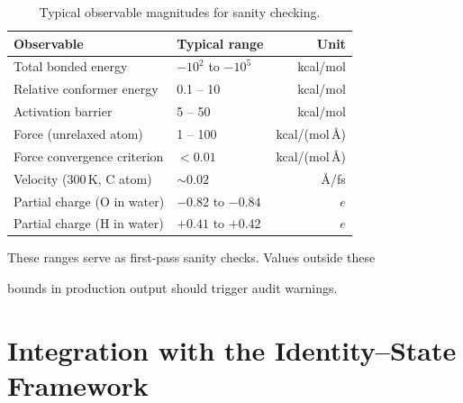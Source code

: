\documentclass[12pt, a4paper, oneside]{article}
\begin{document}
\begin{table}[htbp]

  \centering

  \caption{Typical observable magnitudes for sanity checking.}

  \label{tab:ranges}

  \begin{tabular}{llr}

    \toprule

    Observable & Typical range & Unit \\

    \midrule

    Total bonded energy          & $-10^2$ to $-10^5$   & kcal/mol \\

    Relative conformer energy    & 0.1 -- 10            & kcal/mol \\

    Activation barrier           & 5 -- 50              & kcal/mol \\

    Force (unrelaxed atom)       & 1 -- 100             & kcal/(mol\,\AA) \\

    Force convergence criterion  & $< 0.01$             & kcal/(mol\,\AA) \\

    Velocity (300\,K, C atom)    & $\sim 0.02$          & \AA/fs \\

    Partial charge (O in water)  & $-0.82$ to $-0.84$   & $e$ \\

    Partial charge (H in water)  & $+0.41$ to $+0.42$   & $e$ \\

    \bottomrule

  \end{tabular}

\end{table}


These ranges serve as first-pass sanity checks.  Values outside these

bounds in production output should trigger audit warnings.



\section{Integration with the Identity--State Framework}
\end{document}
